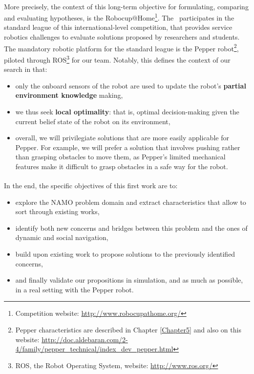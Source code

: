 \paragraph{} More precisely, the context of this long-term objective for formulating, comparing and evaluating hypotheses, is the Robocup@Home\footnote{Competition website: \url{http://www.robocupathome.org/}}. The \groupname \, participates in the standard league of this international-level competition, that provides service robotics challenges to evaluate solutions proposed by researchers and students. The mandatory robotic platform for the standard league is the Pepper robot\footnote{Pepper characteristics are described in Chapter \ref{Chapter5} and also on this website: \url{http://doc.aldebaran.com/2-4/family/pepper_technical/index_dev_pepper.html}}, piloted through ROS\footnote{ROS, the Robot Operating System, website: \url{http://www.ros.org/}} for our team. Notably, this defines the context of our search in that:
\begin{itemize}
  \item only the onboard sensors of the robot are used to update the robot's \textbf{partial environment knowledge} making,
  \item we thus seek \textbf{local optimality}: that is, optimal decision-making given the current belief state of the robot on its environment,
  \item overall, we will privilegiate solutions that are more easily applicable for Pepper. For example, we will prefer a solution that involves pushing rather than grasping obstacles to move them, as Pepper's limited mechanical features make it difficult to grasp obstacles in a safe way for the robot.
\end{itemize}

\paragraph{} In the end, the specific objectives of this first work are to:
\begin{itemize}
  \item explore the NAMO problem domain and extract characteristics that allow to sort through existing works,
  \item identify both new concerns and bridges between this problem and the ones of dynamic and social navigation,
  \item build upon existing work to propose solutions to the previously identified concerns,
  \item and finally validate our propositions in simulation, and as much as possible, in a real setting with the Pepper robot.
\end{itemize}

